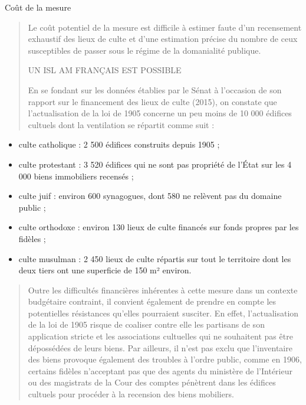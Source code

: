 Coût de la mesure

\begin{quote}
Le coût potentiel de la mesure est difficile à estimer faute d'un
recensement exhaustif des lieux de culte et d'une estimation précise du
nombre de ceux susceptibles de passer sous le régime de la domanialité
publique.

UN ISL AM FRANÇAIS EST POSSIBLE

En se fondant sur les données établies par le Sénat à l'occasion de son
rapport sur le financement des lieux de culte (2015), on constate que
l'actualisation de la loi de 1905 concerne un peu moins de 10 000
édifices cultuels dont la ventilation se répartit comme suit :
\end{quote}

\begin{itemize}
\item
  culte catholique : 2 500 édifices construits depuis 1905 ;
\item
  culte protestant : 3 520 édifices qui ne sont pas propriété de l'État
  sur les 4 000 biens immobiliers recensés ;
\item
  culte juif : environ 600 synagogues, dont 580 ne relèvent pas du
  domaine public ;
\item
  culte orthodoxe : environ 130 lieux de culte financés sur fonds
  propres par les fidèles ;
\item
  culte musulman : 2 450 lieux de culte répartis sur tout le territoire
  dont les deux tiers ont une superficie de 150 m² environ.
\end{itemize}

\begin{quote}
Outre les difficultés financières inhérentes à cette mesure dans un
contexte budgétaire contraint, il convient également de prendre en
compte les potentielles résistances qu'elles pourraient susciter. En
effet, l'actualisation de la loi de 1905 risque de coaliser contre elle
les partisans de son application stricte et les associations cultuelles
qui ne souhaitent pas être dépossédées de leurs biens. Par ailleurs, il
n'est pas exclu que l'inventaire des biens provoque également des
troubles à l'ordre public, comme en 1906, certains fidèles n'acceptant
pas que des agents du ministère de l'Intérieur ou des magistrats de la
Cour des comptes pénètrent dans les édifices cultuels pour procéder à la
recension des biens mobiliers.
\end{quote}
